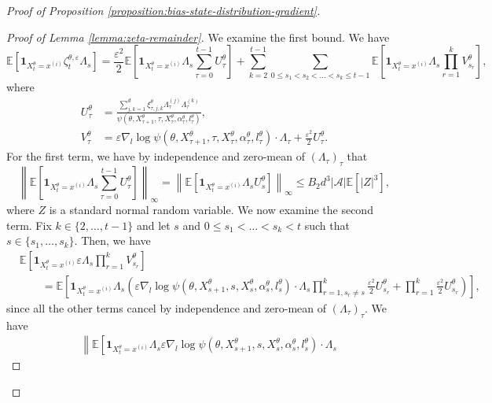 \documentclass[11pt]{article}
\numberwithin{equation}{section}
\theoremstyle{definition}
\theoremstyle{remark}
\def\eps{\varepsilon}
\def\cA{\mathcal{A}}
\begin{document}
\begin{proof}[Proof of Proposition \ref{proposition:bias-state-distribution-gradient}]
\begin{proof}[Proof of Lemma \ref{lemma:zeta-remainder}]
    We examine the first bound. We have
    \[
        \mathbb E \left[ \mathbf 1_{X_t^\theta = x^{(i)}} \zeta_t^{\theta, \eps} \Lambda_s \right]
        = \frac{\eps^2}{2} \mathbb E \left[\mathbf 1_{X_t^\theta = x^{(i)}} \Lambda_s  \sum_{\tau=0}^{t-1} U_\tau^\theta \right]
        + \sum_{k = 2}^{t-1} \sum_{0 \leq s_1 < s_2 < \ldots < s_k \leq t-1} \mathbb E \left[\mathbf 1_{X_t^\theta = x^{(i)}} \Lambda_s\prod_{r = 1}^k V^\theta_{s_r}\right],
    \]
    where 
    \[ 
    \begin{aligned}
    U^\theta_\tau &= \frac{\sum_{j,k=1}^d \xi^\theta_{\tau,j,k} \Lambda_\tau^{(j)} \Lambda_\tau^{(k)}}{\psi(\theta, X_{\tau + 1}^\theta, \tau, X_\tau^\theta, \alpha_\tau^\theta, l_\tau^\theta)}, \\
    V^\theta_{\tau} &=  \eps \nabla_l \log \psi(\theta, X^\theta_{\tau + 1}, \tau,X_{\tau}^\theta, \alpha_{\tau}^\theta, l_{\tau}^\theta) \cdot \Lambda_{\tau} 
 + \frac{\eps^2}{2}U^\theta_{\tau}.
    \end{aligned}
    \]
    For the first term, we have by independence and zero-mean of $(\Lambda_\tau)_\tau$ that 
    \[
    \left\|\mathbb E \left[\mathbf 1_{X_t^\theta = x^{(i)}} \Lambda_s \sum_{\tau = 0}^{t-1}U_\tau^\theta \right] \right\|_\infty 
    = \left\| \mathbb E \left[\mathbf 1_{X_t^\theta = x^{(i)}} \Lambda_s U_s^\theta \right] \right\|_\infty 
    \leq B_2 d^3 | \cA | \mathbb E[|Z|^3],
\]
    where $Z$ is a standard normal random variable.
    We now examine the second term.
    Fix $k \in \{2, \ldots,t-1\}$ and let $s$ and $0 \leq s_1 < \ldots < s_k < t$ such that $s \in \{s_1, \ldots, s_k\}$. Then, we have
    \[
    \begin{aligned}
    &\mathbb E \left[ \mathbf 1_{X_t^\theta = x^{(i)}} \eps \Lambda_s\prod_{r = 1}^k V^\theta_{s_r}\right] \\
    & \qquad =\mathbb E \left[ \mathbf 1_{X_t^\theta = x^{(i)}} \Lambda_s \left( \eps \nabla_l \log \psi(\theta, X^\theta_{s + 1}, s,X_{s}^\theta, \alpha_{s}^\theta, l_{s}^\theta) \cdot \Lambda_{s} \prod_{r = 1, s_r \neq s}^{k} \frac{\eps^2}{2} U_{s_r}^\theta
    +\prod_{r=1}^{k} \frac{\eps^2}{2} U^\theta_{s_r} \right) \right],
    \end{aligned}
    \]
    since all the other terms cancel by independence and zero-mean of $(\Lambda_\tau)_\tau$.
    We have 
    \[
    \begin{aligned}
    &\left\|\mathbb E \left[ 
        \mathbf 1_{X_t^\theta = x^{(i)}} \Lambda_s \eps \nabla_l \log \psi(\theta, X^\theta_{s + 1}, s,X_{s}^\theta, \alpha_{s}^\theta, l_{s}^\theta) \cdot \Lambda_{s} 

\end{aligned}\]
\end{proof}
\end{proof}
\end{document}
